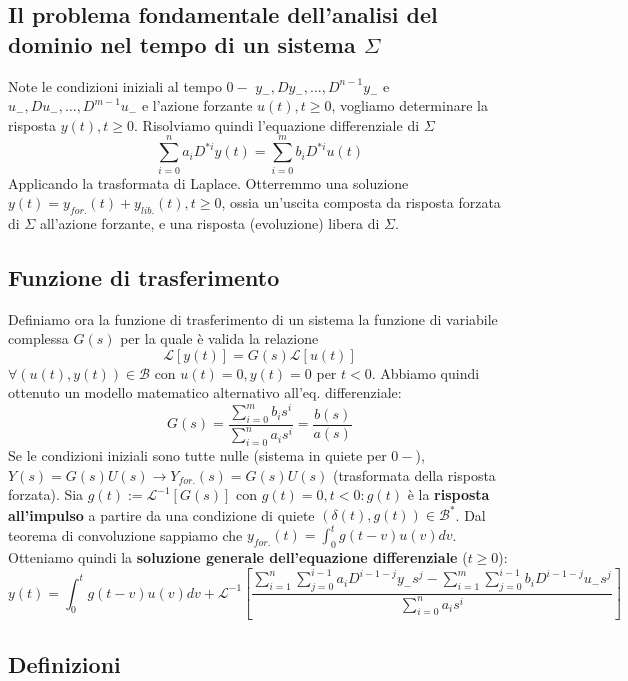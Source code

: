 \documentclass[11pt]{article}
\begin{document}
\subsection{Il problema fondamentale dell'analisi del dominio nel tempo di un sistema $\Sigma$}
Note le condizioni iniziali al tempo $0-$  $y_-, Dy_-,...,D^{n-1}y_-$ e $u_-,Du_-,\dots,D^{m-1}u_-$ e l'azione forzante $u(t), t\ge0$, vogliamo determinare la risposta $y(t), t\ge0$.
Risolviamo quindi l'equazione differenziale di $\Sigma$
\begin{displaymath}
    \sum_{i=0}^n a_i D^{*i} y(t) = \sum_{i=0}^m b_i D^{*i} u(t)
\end{displaymath}
Applicando la trasformata di Laplace. Otterremmo una soluzione $y(t) = y_{for.}(t) + y_{lib.}(t), t\ge0$, ossia un'uscita composta da risposta forzata di $\Sigma$ all'azione forzante, e una risposta (evoluzione) libera di $\Sigma$.
\subsection{Funzione di trasferimento}
Definiamo ora la funzione di trasferimento di un sistema la funzione di variabile complessa $G(s)$ per la quale è valida la relazione
\begin{displaymath}
    \mathcal{L}[y(t)] = G(s)\mathcal{L}[u(t)]
\end{displaymath}
$\forall (u(t), y(t)) \in \mathcal{B}$ con $u(t)=0, y(t)=0$ per $t<0$.
Abbiamo quindi ottenuto un modello matematico alternativo all'eq. differenziale:
\begin{displaymath}
    G(s)=\frac{\sum_{i=0}^m b_i s^i}{\sum_{i=0}^n a_i s^i}=\frac{b(s)}{a(s)}
\end{displaymath}
Se le condizioni iniziali sono tutte nulle (sistema in quiete per $0-$), $Y(s)=G(s)U(s)\rightarrow Y_{for.}(s)=G(s)U(s)$ (trasformata della risposta forzata). Sia $g(t):=\mathcal{L}^{-1} [G(s)]$ con $g(t)=0, t<0: g(t)$ è la \textbf{risposta all'impulso} a partire da una condizione di quiete $(\delta(t), g(t)) \in \mathcal{B}^*$. Dal teorema di convoluzione sappiamo che $y_{for.}(t) = \int_0^t g(t-v)u(v)dv$. Otteniamo quindi la \textbf{soluzione generale dell'equazione differenziale} ($t\ge0$):
\begin{displaymath}
    y(t)=\int_0^t g(t-v)u(v)dv + \mathcal{L}^{-1}\left[\frac{\sum_{i=1}^n \sum_{j=0}^{i-1}a_i D^{i-1-j}y_- s^j - \sum_{i=1}^{m} \sum_{j=0}^{i-1} b_i D^{i-1-j}u_- s^j}{\sum_{i=0}^n a_is^i}\right]
\end{displaymath}
\subsection{Definizioni}
\end{document}
